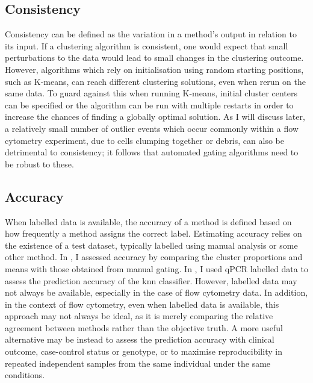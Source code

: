 \subsection{Consistency}
Consistency can be defined as the variation in a method's output in relation to its input.
If a clustering algorithm is consistent, one would expect that small perturbations to the data would lead to small changes in the clustering outcome.
However, algorithms which rely on initialisation using random starting positions, such as K-means, can reach different clustering solutions, even when rerun on the same data.
To guard against this when running K-means, initial cluster centers can be specified or the algorithm can be run with multiple restarts in order to increase the chances of finding a globally optimal solution.
As I will discuss later, a relatively small number of outlier events which occur commonly within a flow cytometry experiment, due to cells clumping together or debris, can also be detrimental to consistency; it follows that automated gating algorithms need to be robust to these.

\subsection{Accuracy}
When labelled data is available, the accuracy of a method is defined based on how frequently a method assigns the correct label.
Estimating accuracy relies on the existence of a test dataset, typically labelled using manual analysis or some other method.
In , I assessed accuracy by comparing the cluster proportions and means with those obtained from manual gating.
In , I used qPCR labelled data to assess the prediction accuracy of the \gls{knn} classifier.
However, labelled data may not always be available, especially in the case of flow cytometry data.
In addition, in the context of flow cytometry, even when labelled data is available, this approach may not always be ideal,
as it is merely comparing the relative agreement between methods rather than the objective truth.
A more useful alternative may be instead to assess the prediction accuracy with clinical outcome, case-control status or genotype, or to maximise reproducibility in repeated independent samples from the same individual under the same conditions.

